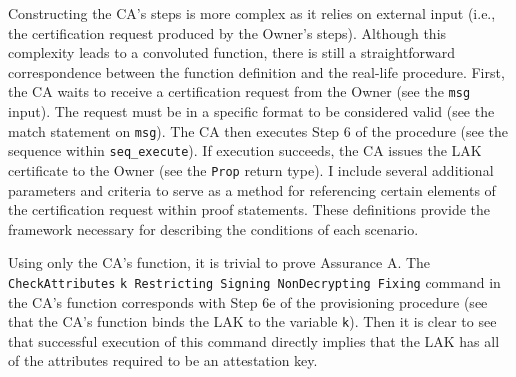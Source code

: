 \documentclass[runningheads]{llncs}
\begin{document}
Constructing the CA's steps is more complex as it relies on external input (i.e., the certification request produced by the Owner's steps). Although this complexity leads to a convoluted function, there is still a straightforward correspondence between the function definition and the real-life procedure. First, the CA waits to receive a certification request from the Owner (see the \verb|msg| input). The request must be in a specific format to be considered valid (see the match statement on \verb|msg|). The CA then executes Step 6 of the procedure (see the sequence within \verb|seq_execute|). If execution succeeds, the CA issues the LAK certificate to the Owner (see the \verb|Prop| return type). I include several additional parameters and criteria to serve as a method for referencing certain elements of the certification request within proof statements. These definitions provide the framework necessary for describing the conditions of each scenario. 


Using only the CA's function, it is trivial to prove Assurance A. The \verb|CheckAttributes| \verb|k Restricting Signing NonDecrypting Fixing| command in the CA's function corresponds with Step 6e of the provisioning procedure 
(see that the CA's function binds the LAK to the variable \verb|k|). Then it is clear to see that successful execution of this command directly implies that the LAK has all of the attributes required to be an attestation key.
\end{document}
